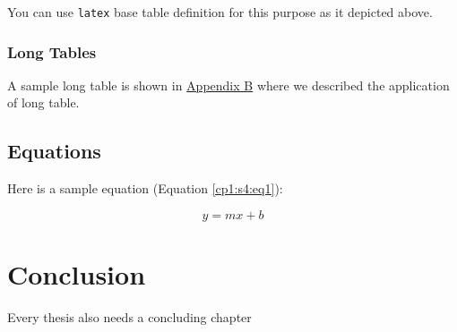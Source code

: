 \documentclass[12pt]{report}
\begin{document}
You can use \texttt{latex} base table definition for this purpose as it depicted above.

\subsection{Long Tables}
\label{cp1:s3:ss1}
A sample long table is shown in \href{appendixB.org}{Appendix B}  where we described the application of
long table.

\section{Equations}
\label{cp1:s4}
Here is a sample equation (Equation \ref{cp1:s4:eq1}):

\begin{equation}
\label{cp1:s4:eq1}
	y = mx + b
\end{equation}


\setcounter{figure}{0}
\setcounter{equation}{0}
\setcounter{table}{0}
\chapter{Conclusion}
\label{conclusion}
Every thesis also needs a concluding chapter

\setcounter{figure}{0}
\setcounter{equation}{0}
\setcounter{table}{0}
\end{document}
